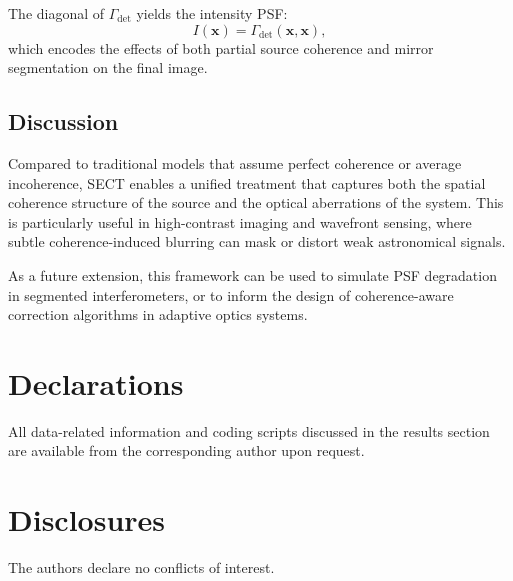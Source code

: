 \documentclass[a4paper,12pt]{article}
\begin{document}
The diagonal of $\Gamma_{\text{det}}$ yields the intensity PSF:
\begin{equation}
I(\bm{x}) = \Gamma_{\text{det}}(\bm{x}, \bm{x}),
\end{equation}
which encodes the effects of both partial source coherence and mirror segmentation on the final image.

\subsection{Discussion}

Compared to traditional models that assume perfect coherence or average incoherence, SECT enables a unified treatment that captures both the spatial coherence structure of the source and the optical aberrations of the system. This is particularly useful in high-contrast imaging and wavefront sensing, where subtle coherence-induced blurring can mask or distort weak astronomical signals.

As a future extension, this framework can be used to simulate PSF degradation in segmented interferometers, or to inform the design of coherence-aware correction algorithms in adaptive optics systems.



\section*{Declarations}
All data-related information and coding scripts discussed in the results section are available from the 
corresponding author upon request.

\section*{Disclosures}
The authors declare no conflicts of interest.



%
\end{document}
